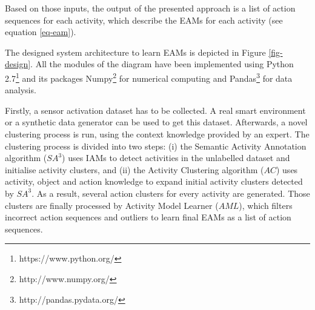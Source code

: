Based on those inputs, the output of the presented approach is a list of action sequences for each activity, which describe the EAMs for each activity (see equation \ref{eq-eam}). %

The designed system architecture to learn EAMs is depicted in Figure \ref{fig-design}. All the modules of the diagram have been implemented using Python 2.7\footnote{https://www.python.org/} and its packages Numpy\footnote{http://www.numpy.org/} for numerical computing and Pandas\footnote{http://pandas.pydata.org/} for data analysis. 

Firstly, a sensor activation dataset has to be collected. A real smart environment or a synthetic data generator can be used to get this dataset. Afterwards, a novel clustering process is run, using the context knowledge provided by an expert. The clustering process is divided into two steps: (i) the Semantic Activity Annotation algorithm ($SA^3$) uses IAMs to detect activities in the unlabelled dataset and initialise activity clusters, and (ii) the Activity Clustering algorithm ($AC$) uses activity, object and action knowledge to expand initial activity clusters detected by $SA^3$. As a result, several action clusters for every activity are generated. Those clusters are finally processed by Activity Model Learner ($AML$), which filters incorrect action sequences and outliers to learn final EAMs as a list of action sequences.


